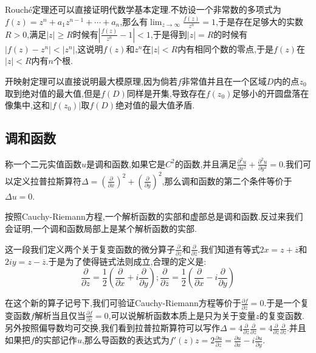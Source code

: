 Rouch\'e定理还可以直接证明代数学基本定理.不妨设一个非常数的多项式为$f(z)=z^n+a_1z^{n-1}+\cdots+a_n$,那么有$\lim_{z\to\infty}\frac{f(z)}{z^n}=1$,于是存在足够大的实数$R>0$,满足$|z|\ge R$时候有$\left|\frac{f(z)}{z^n}-1\right|<1$,于是得到$|z|=R$的时候有$|f(z)-z^n|<|z^n|$,这说明$f(z)$和$z^n$在$|z|<R$内有相同个数的零点,于是$f(z)$在$|z|<R$内有$n$个根.

开映射定理可以直接说明最大模原理,因为倘若$f$非常值并且在一个区域$D$内的点$z_0$取到绝对值的最大值,但是$f(D)$同样是开集,导致存在$f(z_0)$足够小的开圆盘落在像集中,这和$|f(z_0)|$取$f(D)$绝对值的最大值矛盾.
\newpage
\subsection{调和函数}

称一个二元实值函数$u$是调和函数,如果它是$C^2$的函数,并且满足$\frac{\partial^2u}{\partial x^2}+\frac{\partial^2u}{\partial y^2}=0$.我们可以定义拉普拉斯算符$\Delta=\left(\frac{\partial}{\partial x}\right)^2+\left(\frac{\partial}{\partial y}\right)^2$,那么调和函数的第二个条件等价于$\Delta u=0$.

按照Cauchy-Riemann方程,一个解析函数的实部和虚部总是调和函数.反过来我们会证明,一个调和函数局部上是某个解析函数的实部.

这一段我们定义两个关于复变函数的微分算子$\frac{\partial}{\partial z}$和$\frac{\partial}{\partial\overline{z}}$.我们知道有等式$2x=z+\overline{z}$和$2iy=z-\overline{z}$.于是为了使得链式法则成立,合理的定义是:
$$\frac{\partial}{\partial z}=\frac{1}{2}\left(\frac{\partial}{\partial x}+i\frac{\partial}{\partial y}\right);\frac{\partial}{\partial\overline{z}}=\frac{1}{2}\left(\frac{\partial}{\partial x}-i\frac{\partial}{\partial y}\right)$$

在这个新的算子记号下,我们可验证Cauchy-Riemann方程等价于$\frac{\partial f}{\partial\overline{z}}=0$.于是一个复变函数$f$解析当且仅当$\frac{\partial f}{\partial\overline{z}}=0$,可以说解析函数本质上是只为关于变量$z$的复变函数.另外按照偏导数均可交换,我们看到拉普拉斯算符可以写作$\Delta=4\frac{\partial}{\partial z}\frac{\partial}{\partial\overline{z}}=4\frac{\partial}{\partial\overline{z}}\frac{\partial}{\partial z}$.并且如果把$f$的实部记作$u$,那么导函数的表达式为$f'(z)z=2\frac{\partial u}{\partial z}=\frac{\partial u}{\partial x}-i\frac{\partial u}{\partial y}$.


